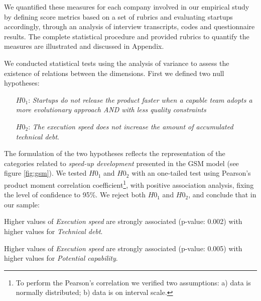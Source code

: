 \documentclass[10pt,journal,letterpaper,compsoc]{IEEEtran}
\begin{document}
We quantified these measures for each company involved in our empirical study
by defining score metrics based on a set of rubrics and evaluating startups
accordingly, through an analysis of interview transcripts, codes and
questionnaire results. The complete statistical procedure and provided rubrics
to quantify the measures are illustrated and discussed in Appendix. 

We conducted statistical tests  using the analysis of
variance to assess the  existence of relations between the dimensions. First we
defined two null  hypotheses:

\begin{itemize} 
\item[$H0_1$:] \textit{Startups do not release the product
faster  when a capable team adopts a more evolutionary approach AND with less
quality  constraints} 
\item[$H0_2$:] \textit{The execution speed does not
increase the amount  of accumulated technical debt}.
\end{itemize}

The formulation of the two hypotheses reflects the representation of the
categories related to \textit{speed-up development} presented in the GSM model
(see figure \ref{fig:gsm}). We tested $H0_1$ and $H0_2$  with an  one-tailed
test using Pearson's product moment correlation  coefficient\footnote{To perform
the Pearson's correlation we verified two  assumptions: a) data is normally
distributed; b) data is on interval scale.},  with positive association
analysis, fixing the level of confidence to 95\%. We reject both $H0_1$ and
$H0_2$, and conclude that in our sample: 
\begin{compactenum}
\item Higher values of \textit{Execution speed} are strongly associated  
(p-value: 0.002) with higher values for \textit{Technical debt}.

\item Higher values of \textit{Execution speed} are  strongly associated
(p-value: 0.005) with higher values for   \textit{Potential capability}.
\end{compactenum}
\end{document}
